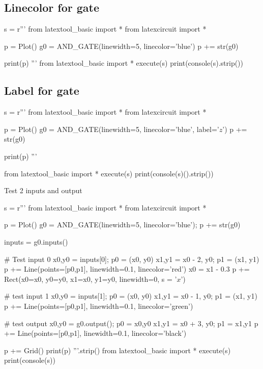 \newpage
\subsection{Linecolor for gate}
\begin{python}
s = r'''
from latextool_basic import *
from latexcircuit import *

p = Plot()
g0 = AND_GATE(linewidth=5, linecolor='blue')
p += str(g0)

print(p)
'''
from latextool_basic import *
execute(s)
print(console(s).strip())
\end{python}


\newpage
\subsection{Label for gate}
\begin{python}
s = r'''
from latextool_basic import *
from latexcircuit import *

p = Plot()
g0 = AND_GATE(linewidth=5, linecolor='blue', label='$z$')
p += str(g0)

print(p)
'''

from latextool_basic import *
execute(s)
print(console(s)().strip())
\end{python}






Test 2 inputs and output
\begin{python}
s = r'''
from latextool_basic import *
from latexcircuit import *

p = Plot()
g0 = AND_GATE(linewidth=5, linecolor='blue'); p += str(g0)

inputs = g0.inputs()

# Test input 0
x0,y0 = inputs[0]; p0 = (x0, y0)
x1,y1 = x0 - 2, y0; p1 = (x1, y1)
p += Line(points=[p0,p1], linewidth=0.1, linecolor='red')
x0 = x1 - 0.3
p += Rect(x0=x0, y0=y0, x1=x0, y1=y0, linewidth=0, s = '$x$')

# test input 1
x0,y0 = inputs[1]; p0 = (x0, y0)
x1,y1 = x0 - 1, y0; p1 = (x1, y1)
p += Line(points=[p0,p1], linewidth=0.1, linecolor='green')

# test output
x0,y0 = g0.output(); p0 = x0,y0
x1,y1 = x0 + 3, y0; p1 = x1,y1
p += Line(points=[p0,p1], linewidth=0.1, linecolor='black')

p += Grid()
print(p)
'''.strip()
from latextool_basic import *
execute(s)
print(console(s))
\end{python}


